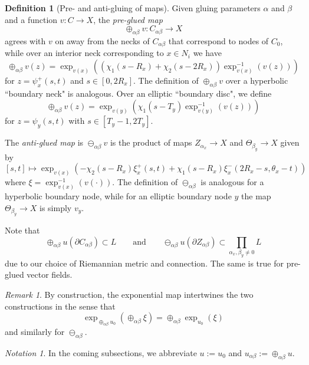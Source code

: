 \documentclass[11pt,psamsfonts, oneside, reqno]{amsart}
\newcommand{\sub}{\subset}%
\newcommand{\p}[2]{\prod\limits_{#1}{#2} }
\newcommand{\inv}{^{-1}}
\newcommand{\cl}{\colon}
\newcommand{\del}{\partial}
\theoremstyle{definition}
\newtheorem{definition}[theorem]{Definition}
\theoremstyle{remark}
\newtheorem{remark}[theorem]{Remark}
\newtheorem*{notation*}{Notation}
\numberwithin{equation}{section}
\begin{document}
\begin{definition}[Pre- and anti-gluing of maps]\label{}
	Given gluing parameters $\alpha$ and $\beta$ and a function $v\cl C\to X$, the \emph{pre-glued map} 
	$$\oplus_{\alpha\beta} v \cl C_{\alpha\beta}\to X$$\noindent 
	agrees with $v$ on away from the necks of $C_{\alpha\beta}$ that correspond to nodes of $C_0$, while over an interior neck corresponding to $x \in N_i$ we have
	\begin{equation*}\label{}\oplus_{\alpha\beta} v(z) = 
			\exp_{v(x)}((\chi_1(s-R_x)+\chi_2(s-2R_x))\exp_{v(x)}\inv(v(z))) \end{equation*}
		for $z = \psi^+_x(s,t)$ and $s \in [0,2R_x]$.
	The definition of $\oplus_{\alpha\beta} v$ over a hyperbolic ``boundary neck" is analogous. Over an elliptic ``boundary disc", we define 
	\begin{equation*}\label{}\oplus_{\alpha\beta} v(z) = \exp_{v(y)}(\chi_1(s-T_y)\exp_{v(y)}\inv(v(z)))\end{equation*}
	for $z = \psi_y(s,t)$ with $s \in [T_y-1,2T_y]$.\par
	The \emph{anti-glued map} is $\ominus_{\alpha\beta}v$ is the product of maps $Z_{\alpha_x}\to X$ and $\Theta_{\beta_y}\to X$ given by 
	\begin{equation}\label{} [s,t] \mapsto 
		\exp_{v(x)}(-\chi_2(s-R_x)\xi_x^+(s,t) + \chi_1(s-R_x)\xi_x^-(2R_x-s,\theta_x-t)) 
	\end{equation}
where $\xi = \exp_{v(x)}\inv(v(\cdot))$. The definition of $\ominus_{\alpha\beta}$ is analogous for a hyperbolic boundary node, while for an elliptic boundary node $y$ the map $\Theta_{\beta_y}\to X$ is simply $v_y$.
\end{definition}

\noindent
Note that $$\oplus_{\alpha\beta} u(\del C_{\alpha\beta})\sub L\qquad \text{and}\qquad\ominus_{\alpha\beta}u(\del Z_{\alpha\beta})\sub \p{\alpha_x,\beta_y\neq 0}{L}$$\noindent 
due to our choice of Riemannian metric and connection. The same is true for pre-glued vector fields.

\begin{remark}\label{}By construction, the exponential map intertwines the two constructions in the sense that 
$$\exp_{\oplus_{\alpha\beta} u_0}(\oplus_{\alpha\beta}\xi) = \oplus_{\alpha\beta} \exp_{u_0}(\xi)$$\noindent
and similarly for $\ominus_{\alpha\beta}$. 
\end{remark}

\begin{notation*}In the coming subsections, we abbreviate $u := u_0$ and $u_{\alpha\beta} := \oplus_{\alpha\beta}u$.\end{notation*}
\end{document}
